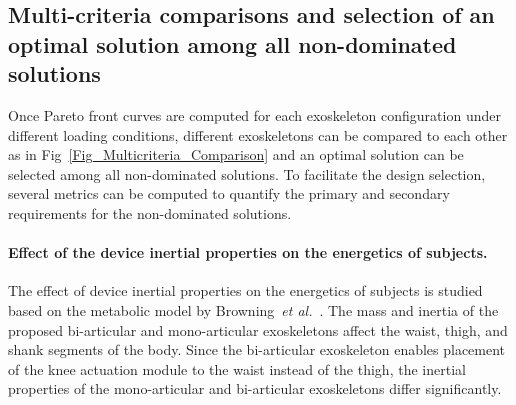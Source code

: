 \documentclass[10pt,letterpaper]{article}
\newcommand{\etal}{\textit{et al.}}
\begin{document}
%

\subsection*{Multi-criteria comparisons and selection of an optimal solution among all non-dominated solutions}
\label{mass_inertia_subsection}
Once Pareto front curves are computed for each exoskeleton configuration under different loading conditions, different exoskeletons can be compared to each other  as in Fig~\ref{Fig_Multicriteria_Comparison} and an optimal solution can be selected among all non-dominated solutions. To facilitate the design selection, several metrics can be computed to quantify  the primary and secondary requirements for the non-dominated solutions.

\paragraph*{Effect of the device inertial properties on the energetics of subjects.}

The effect of device inertial properties on the energetics of subjects is studied based on the metabolic model by Browning~\etal~\cite{Browning2007}. The mass and inertia of the proposed bi-articular and mono-articular exoskeletons affect the waist, thigh, and shank segments of the body. Since the bi-articular exoskeleton enables placement of the knee actuation module to the waist instead of the thigh, the inertial properties of the mono-articular and bi-articular exoskeletons differ significantly. %
\end{document}
